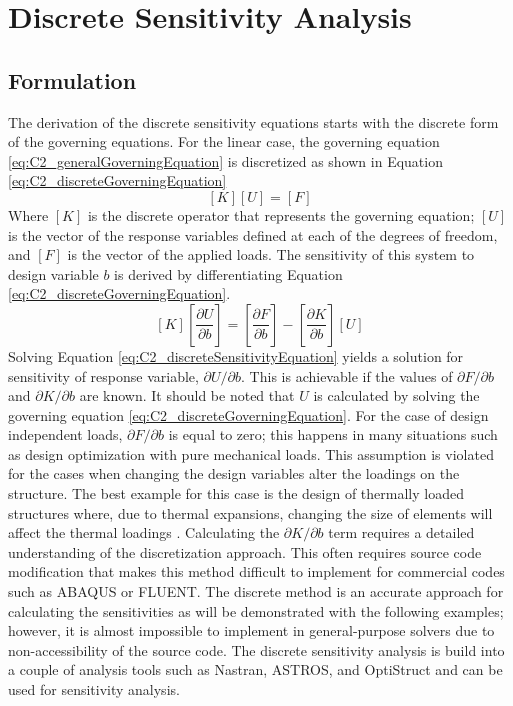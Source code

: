 \section{Discrete Sensitivity Analysis}
\subsection{Formulation}
The derivation of the discrete sensitivity equations starts with the discrete form of the governing equations. For the linear case, the governing equation \eqref{eq:C2_generalGoverningEquation} is discretized as shown in Equation \eqref{eq:C2_discreteGoverningEquation}
%
\begin{equation}\label{eq:C2_discreteGoverningEquation}
    \left[ K \right] \left[ U \right] = \left[ F \right]
\end{equation}
%
Where $[K]$ is the discrete operator that represents the governing equation; $[U]$ is the vector of the response variables defined at each of the degrees of freedom, and $[F]$ is the vector of the applied loads. The sensitivity of this system to design variable $b$ is derived by differentiating Equation \eqref{eq:C2_discreteGoverningEquation}.
%
\begin{equation}\label{eq:C2_discreteSensitivityEquation}
    \left[ K \right] \left[ \frac{\partial U}{\partial b} \right] = 
    \left[ \frac{\partial F}{\partial b} \right] - 
    \left[ \frac{\partial K}{\partial b} \right] \left[ U \right]
\end{equation}
%
Solving Equation \eqref{eq:C2_discreteSensitivityEquation} yields a solution for sensitivity of response variable, $\partial U/\partial b$. This is achievable if the values of $\partial F/\partial b$ and $\partial K/\partial b$ are known. It should be noted that $U$ is calculated by solving the governing equation \eqref{eq:C2_discreteGoverningEquation}. For the case of design independent loads, $\partial F/\partial b$ is equal to zero; this happens in many situations such as design optimization with pure mechanical loads. This assumption is violated for the cases when changing the design variables alter the loadings on the structure. The best example for this case is the design of thermally loaded structures where, due to thermal expansions, changing the size of elements will affect the thermal loadings \cite{deaton2013stiffening}. Calculating the $\partial K/\partial b$ term requires a detailed understanding of the discretization approach. This often requires source code modification that makes this method difficult to implement for commercial codes such as ABAQUS or FLUENT. The discrete method is an accurate approach for calculating the sensitivities as will be demonstrated with the following examples; however, it is almost impossible to implement in general-purpose solvers due to non-accessibility of the source code. The discrete sensitivity analysis is build into a couple of analysis tools such as Nastran, ASTROS, and OptiStruct and can be used for sensitivity analysis.
